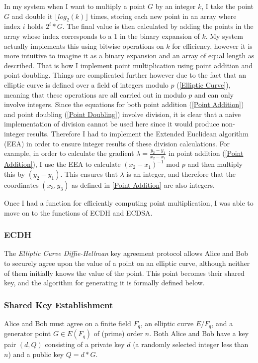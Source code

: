 \documentclass[12pt,a4paper]{article}
\begin{document}
In my system when I want to multiply a point $G$ by an integer $k$, 
I take the point $G$ and double it $\lfloor log_2(k) \rfloor$ times, storing each new point in an array where index $i$ holds $2^i * G$. 
The final value is then calculated by adding the points in the array whose index corresponds to a $1$ in the binary expansion of $k$. 
My system actually implements this using bitwise operations on $k$ for efficiency, 
however it is more intuitive to imagine it as a binary expansion and an array of equal length as described. 
That is how I implement point multiplication using point addition and point doubling. 
Things are complicated further however due to the fact that an elliptic curve is defined over a field of integers modulo $p$ (\ref{Elliptic Curve}), 
meaning that these operations are all carried out in modulo $p$ and can only involve integers. 
Since the equations for both point addition (\ref{Point Addition}) and point doubling (\ref{Point Doubling}) involve division, 
it is clear that a naive implementation of division cannot be used here since it would produce non-integer results. 
Therefore I had to implement the Extended Euclidean algorithm (EEA) in order to ensure integer results of these division calculations. 
For example, in order to calculate the gradient $\lambda = \frac{y_2-y_1}{x_2-x_1}$ in point addition (\ref{Point Addition}), 
I use the EEA to calculate $(x_2-x_1)^{-1}$ mod $p$ and then multiply this by $(y_2-y_1)$. 
This ensures that $\lambda$ is an integer, and therefore that the coordinates $(x_3,y_3)$ as defined in \ref{Point Addition} 
are also integers. 

Once I had a function for efficiently computing point multiplication, I was able to move on to the functions of ECDH and ECDSA. 

\subsubsection{ECDH}\noindent \label{ECDH}
The \emph{Elliptic Curve Diffie-Hellman} key agreement protocol allows Alice and Bob 
to securely agree upon the value of a point on an elliptic curve, although neither of them initially knows the value of the point. 
This point becomes their shared key, and the algorithm for generating it is formally defined below. 


\subsubsection{Shared Key Establishment}\noindent
Alice and Bob must agree on a finite field $F_q$, an elliptic curve $E/F_q$, and a generator point $G \in E(F_q)$  of (prime) order $n$.
Both Alice and Bob have a key pair $(d,Q)$ consisting of a private key $d$ (a randomly selected integer less than $n$) 
and a public key $Q = d * G$.
\end{document}
